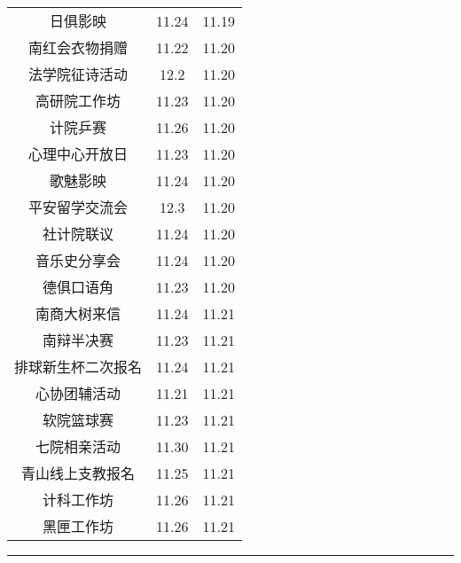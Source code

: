 \documentclass[letterpaper, 12pt]{article}
\begin{document}
\begin{multicols}{2}
{\begin{longtable}{|c|c|c|}
    日俱影映 & 11.24 & 11.19\\
    南红会衣物捐赠 & 11.22 & 11.20\\
    法学院征诗活动 & 12.2 & 11.20\\
    高研院工作坊 & 11.23 & 11.20\\
    计院乒赛 & 11.26 & 11.20\\
    心理中心开放日 & 11.23 & 11.20\\
    歌魅影映 & 11.24 & 11.20\\
    平安留学交流会 & 12.3 & 11.20\\
    社计院联议 & 11.24 & 11.20\\
    音乐史分享会 & 11.24 & 11.20\\
    德俱口语角 & 11.23 & 11.20\\
    南商大树来信 & 11.24 & 11.21\\
    南辩半决赛 & 11.23 & 11.21\\
    排球新生杯二次报名 & 11.24 & 11.21\\
    心协团辅活动 & 11.21 & 11.21\\
    软院篮球赛 & 11.23 & 11.21\\
    七院相亲活动 & 11.30 & 11.21\\
    青山线上支教报名 & 11.25 & 11.21\\
    计科工作坊 & 11.26 & 11.21\\
    黑匣工作坊 & 11.26 & 11.21\\
    
    \hline
\end{longtable}
\unskip
\unpenalty
\unpenalty}\unvbox\colbbox
\end{multicols}
\hrule
\pagebreak
\end{document}
